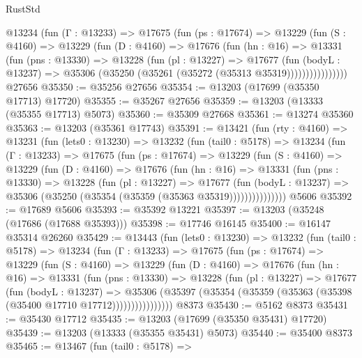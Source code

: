 \begin{lexlean}{RustStd}
\begin{coremodule}
          @13234
            (fun (Γ : @13233) =>
            @17675
              (fun (ps : @17674) =>
              @13229
                (fun (S : @4160) =>
                @13229
                  (fun (D : @4160) =>
                  @17676
                    (fun (hn : @16) =>
                    @13331
                      (fun (pns : @13330) =>
                      @13228
                        (fun (pl : @13227) =>
                        @17677
                          (fun (bodyL : @13237) =>
                          @35306 (@35250 (@35261 (@35272 (@35313 @35319))))))))))))))))
    @27656
@35350 := @35256 @27656
@35354 := @13203 (@17699 (@35350 @17713) @17720)
@35355 := @35267 @27656
@35359 := @13203 (@13333 (@35355 @17713) @5073)
@35360 := @35309 @27668
@35361 := @13274 @35360
@35363 := @13203 (@35361 @17743)
@35391 := @13421
    (fun (rty : @4160) =>
    @13231
      (fun (lets0 : @13230) =>
      @13232
        (fun (tail0 : @5178) =>
        @13234
          (fun (Γ : @13233) =>
          @17675
            (fun (ps : @17674) =>
            @13229
              (fun (S : @4160) =>
              @13229
                (fun (D : @4160) =>
                @17676
                  (fun (hn : @16) =>
                  @13331
                    (fun (pns : @13330) =>
                    @13228
                      (fun (pl : @13227) =>
                      @17677
                        (fun (bodyL : @13237) =>
                        @35306 (@35250 (@35354 (@35359 (@35363 @35319)))))))))))))))
    @5606
@35392 := @17689 @5606
@35393 := @35392 @13221
@35397 := @13203 (@35248 (@17686 (@17688 @35393)))
@35398 := @17746 @16145
@35400 := @16147 @35314 @26260
@35429 := @13443
    (fun (lets0 : @13230) =>
    @13232
      (fun (tail0 : @5178) =>
      @13234
        (fun (Γ : @13233) =>
        @17675
          (fun (ps : @17674) =>
          @13229
            (fun (S : @4160) =>
            @13229
              (fun (D : @4160) =>
              @17676
                (fun (hn : @16) =>
                @13331
                  (fun (pns : @13330) =>
                  @13228
                    (fun (pl : @13227) =>
                    @17677
                      (fun (bodyL : @13237) =>
                      @35306
                        (@35397
                          (@35354 (@35359 (@35363 (@35398 (@35400 @17710 @17712))))))))))))))))
    @8373
@35430 := @5162 @8373
@35431 := @35430 @17712
@35435 := @13203 (@17699 (@35350 @35431) @17720)
@35439 := @13203 (@13333 (@35355 @35431) @5073)
@35440 := @35400 @8373
@35465 := @13467
    (fun (tail0 : @5178) =>

\end{coremodule}
\end{lexlean}
